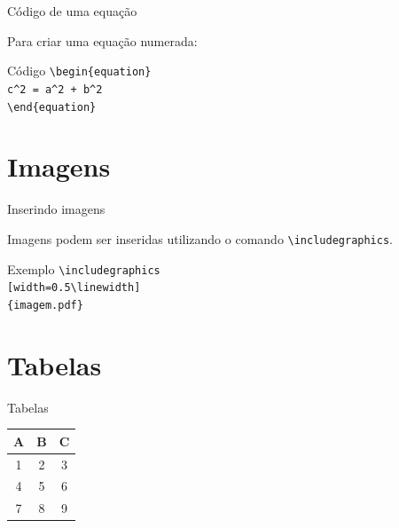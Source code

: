 \documentclass{beamer}
\begin{document}

\begin{frame}{Código de uma equação}

    Para criar uma equação numerada:

    \vspace{0.4cm}

    \begin{block}{Código}
        \texttt{\textbackslash begin\{equation\}}\\

        \hspace{0.5cm}
        \texttt{c\^{}2 = a\^{}2 + b\^{}2}\\

        \texttt{\textbackslash end\{equation\}}
    \end{block}

\end{frame}

\section{Imagens}

\begin{frame}{Inserindo imagens}

    Imagens podem ser inseridas utilizando o comando
    \texttt{\textbackslash includegraphics}.

    \vspace{0.5cm}

    \begin{block}{Exemplo}
        \texttt{\textbackslash includegraphics}\\
        \texttt{[width=0.5\textbackslash linewidth]}\\
        \texttt{\{imagem.pdf\}}
    \end{block}

\end{frame}

\section{Tabelas}

\begin{frame}{Tabelas}

    \begin{center}

        \begin{tabular}{ccc}
            \hline
            A & B & C \\
            \hline
            1 & 2 & 3 \\
            4 & 5 & 6 \\
            7 & 8 & 9 \\
            \hline
        \end{tabular}

    \end{center}

\end{frame}
\end{document}
